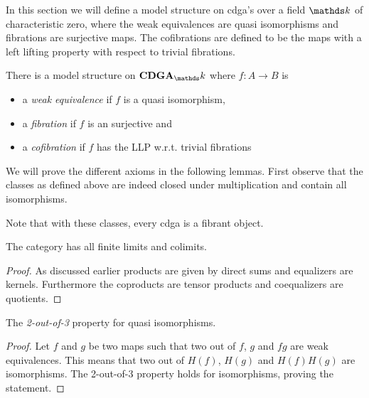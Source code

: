 
In this section we will define a model structure on cdga's over a field $\k$ of characteristic zero, where the weak equivalences are quasi isomorphisms and fibrations are surjective maps. The cofibrations are defined to be the maps with a left lifting property with respect to trivial fibrations.

\begin{proposition}
	There is a model structure on $\CDGA_\k$ where $f: A \to B$ is
	\begin{itemize}
		\item a \emph{weak equivalence} if $f$ is a quasi isomorphism,
		\item a \emph{fibration} if $f$ is an surjective and
		\item a \emph{cofibration} if $f$ has the LLP w.r.t. trivial fibrations
	\end{itemize}
\end{proposition}

We will prove the different axioms in the following lemmas. First observe that the classes as defined above are indeed closed under multiplication and contain all isomorphisms.

Note that with these classes, every cdga is a fibrant object.

\begin{lemma}
	[MC1] The category has all finite limits and colimits.
\end{lemma}
\begin{proof}
	As discussed earlier products are given by direct sums and equalizers are kernels. Furthermore the coproducts are tensor products and coequalizers are quotients.
\end{proof}

\begin{lemma}
	[MC2] The \emph{2-out-of-3} property for quasi isomorphisms.
\end{lemma}
\begin{proof}
	Let $f$ and $g$ be two maps such that two out of $f$, $g$ and $fg$ are weak equivalences. This means that two out of $H(f)$, $H(g)$ and $H(f)H(g)$ are isomorphisms. The 2-out-of-3 property holds for isomorphisms, proving the statement.
\end{proof}

